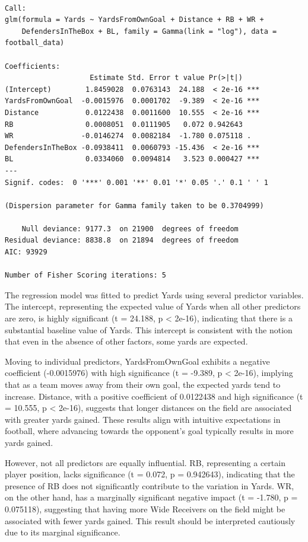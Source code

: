 \documentclass[
  super,
  preprint,
  3p]{elsarticle}
\begin{document}
\begin{verbatim}

Call:
glm(formula = Yards ~ YardsFromOwnGoal + Distance + RB + WR + 
    DefendersInTheBox + BL, family = Gamma(link = "log"), data = football_data)

Coefficients:
                    Estimate Std. Error t value Pr(>|t|)    
(Intercept)        1.8459028  0.0763143  24.188  < 2e-16 ***
YardsFromOwnGoal  -0.0015976  0.0001702  -9.389  < 2e-16 ***
Distance           0.0122438  0.0011600  10.555  < 2e-16 ***
RB                 0.0008051  0.0111905   0.072 0.942643    
WR                -0.0146274  0.0082184  -1.780 0.075118 .  
DefendersInTheBox -0.0938411  0.0060793 -15.436  < 2e-16 ***
BL                 0.0334060  0.0094814   3.523 0.000427 ***
---
Signif. codes:  0 '***' 0.001 '**' 0.01 '*' 0.05 '.' 0.1 ' ' 1

(Dispersion parameter for Gamma family taken to be 0.3704999)

    Null deviance: 9177.3  on 21900  degrees of freedom
Residual deviance: 8838.8  on 21894  degrees of freedom
AIC: 93929

Number of Fisher Scoring iterations: 5
\end{verbatim}

The regression model was fitted to predict Yards using several predictor
variables. The intercept, representing the expected value of Yards when
all other predictors are zero, is highly significant (t = 24.188, p
\textless{} 2e-16), indicating that there is a substantial baseline
value of Yards. This intercept is consistent with the notion that even
in the absence of other factors, some yards are expected.

Moving to individual predictors, YardsFromOwnGoal exhibits a negative
coefficient (-0.0015976) with high significance (t = -9.389, p
\textless{} 2e-16), implying that as a team moves away from their own
goal, the expected yards tend to increase. Distance, with a positive
coefficient of 0.0122438 and high significance (t = 10.555, p
\textless{} 2e-16), suggests that longer distances on the field are
associated with greater yards gained. These results align with intuitive
expectations in football, where advancing towards the opponent's goal
typically results in more yards gained.

However, not all predictors are equally influential. RB, representing a
certain player position, lacks significance (t = 0.072, p = 0.942643),
indicating that the presence of RB does not significantly contribute to
the variation in Yards. WR, on the other hand, has a marginally
significant negative impact (t = -1.780, p = 0.075118), suggesting that
having more Wide Receivers on the field might be associated with fewer
yards gained. This result should be interpreted cautiously due to its
marginal significance.
\end{document}
